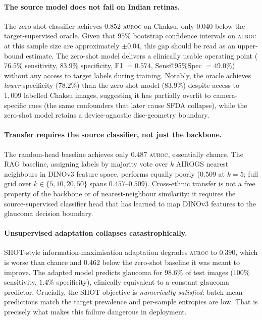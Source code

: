 \documentclass[11pt]{article}
\newcommand{\auroc}{\textsc{auroc}}
\begin{document}
\paragraph{The source model does not fail on Indian retinas.}
The zero-shot classifier achieves $0.852$ \auroc{} on Chaksu, only $0.040$
below the target-supervised oracle. Given that $95\%$ bootstrap confidence
intervals on \auroc{} at this sample size are approximately $\pm 0.04$, this
gap should be read as an upper-bound estimate. The zero-shot model delivers
a clinically usable operating point ($76.5\%$ sensitivity, $83.9\%$
specificity, F1 $= 0.574$, Sens@95\%Spec $= 49.0\%$) without any access
to target labels during training. Notably, the oracle achieves \emph{lower}
specificity ($78.2\%$) than the zero-shot model ($83.9\%$) despite access
to $1{,}009$ labelled Chaksu images, suggesting it has partially overfit
to camera-specific cues (the same confounders that later cause SFDA
collapse), while the zero-shot model retains a device-agnostic
disc-geometry boundary.

\paragraph{Transfer requires the source classifier, not just the backbone.}
The random-head baseline achieves only $0.487$ \auroc{}, essentially chance.
The RAG baseline, assigning labels by majority vote over $k$ AIROGS nearest
neighbours in DINOv3 feature space, performs equally poorly ($0.509$ at
$k{=}5$; full grid over $k \in \{5,10,20,50\}$ spans $0.457$--$0.509$).
Cross-ethnic transfer is not a free property of the backbone or of
nearest-neighbour similarity: it requires the source-supervised classifier
head that has learned to map DINOv3 features to the glaucoma decision
boundary.

\paragraph{Unsupervised adaptation collapses catastrophically.}
SHOT-style information-maximisation adaptation degrades \auroc{} to
$0.390$, which is worse than chance and $0.462$ below the zero-shot
baseline it was meant to improve. The adapted model predicts glaucoma for $98.6\%$ of
test images ($100\%$ sensitivity, $1.4\%$ specificity), clinically
equivalent to a constant glaucoma predictor. Crucially, the SHOT objective
is \emph{numerically satisfied}: batch-mean predictions match the target
prevalence and per-sample entropies are low. That is precisely what makes
this failure dangerous in deployment.
\end{document}
